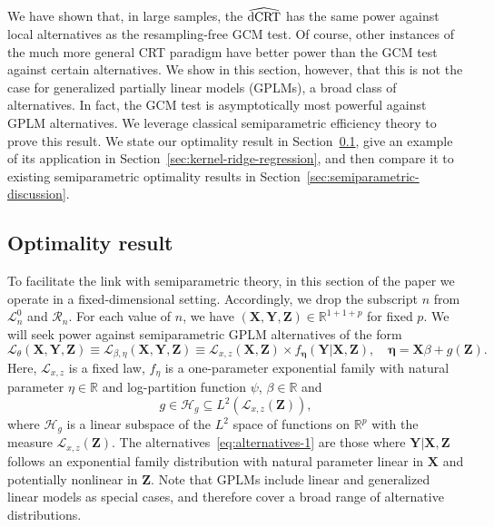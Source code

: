 \documentclass[aos]{imsart}
\theoremstyle{plain}
\theoremstyle{remark}
\newcommand{\R}{\mathbb{R}}								%
\newcommand{\prx}{\bm X}								%
\newcommand{\prz}{\bm Z}								%
\newcommand{\pry}{{\bm Y}}								%
\newcommand{\law}{\mathcal L}							%
\newcommand{\nulllaws}{\mathscr L^0}					%
\newcommand{\regclass}{\mathscr R}					    %
\newcommand{\dCRThat}{\widehat{\textnormal{dCRT}}}		%
\renewcommand{\H}{\mathcal H}		 					%
\begin{document}
We have shown that, in large samples, the $\dCRThat$ has the same power against local alternatives as the resampling-free GCM test. Of course, other instances of the much more general CRT paradigm have better power than the GCM test against certain alternatives. We show in this section, however, that this is not the case for generalized partially linear models (GPLMs), a broad class of alternatives. In fact, the GCM test is asymptotically most powerful against GPLM alternatives. We leverage classical semiparametric efficiency theory \citep{Choi1996, VDV1998, Kosorok2008} to prove this result. We state our optimality result in Section~\ref{sec:optimality-result}, give an example of its application in Section~\ref{sec:kernel-ridge-regression}, and then compare it to existing semiparametric optimality results in Section~\ref{sec:semiparametric-discussion}.

\subsection{Optimality result} \label{sec:optimality-result}

To facilitate the link with semiparametric theory, in this section of the paper we operate in a fixed-dimensional setting. Accordingly, we drop the subscript $n$ from $\nulllaws_n$ and $\regclass_n$. For each value of $n$, we have $(\prx, \pry, \prz) \in \R^{1 + 1 + p}$ for fixed $p$. We will seek power against semiparametric GPLM alternatives of the form
\begin{equation}
    \law_{\theta}(\prx, \pry, \prz) \equiv \law_{\beta, \eta}(\prx, \pry, \prz) \equiv \law_{x,z}(\prx, \prz) \times f_{\bm \eta}(\pry|\prx, \prz),\quad \bm \eta = \prx \beta + g(\prz).
    \label{eq:alternatives-1}
\end{equation}
Here, $\law_{x,z}$ is a fixed law, $f_\eta$ is a one-parameter exponential family with natural parameter $\eta \in \R$ and log-partition function $\psi$, $\beta \in \R$ and 
\begin{equation}
    g \in \H_g \subseteq L^2(\law_{x,z}(\bm Z)), 
\end{equation}
where $\H_g$ is a linear subspace of the $L^2$ space of functions on $\R^p$ with the measure $\law_{x,z}(\bm Z)$. The alternatives~\eqref{eq:alternatives-1} are those where $\pry|\prx,\prz$ follows an exponential family distribution with natural parameter linear in $\prx$ and potentially nonlinear in $\prz$. Note that GPLMs include linear and generalized linear models as special cases, and therefore cover a broad range of alternative distributions.
\end{document}
